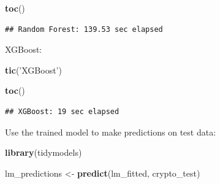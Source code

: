\documentclass[
]{book}
\newenvironment{Shaded}{\begin{snugshade}}{\end{snugshade}}
\newcommand{\DataTypeTok}[1]{\textcolor[rgb]{0.13,0.29,0.53}{#1}}
\newcommand{\KeywordTok}[1]{\textcolor[rgb]{0.13,0.29,0.53}{\textbf{#1}}}
\newcommand{\NormalTok}[1]{#1}
\newcommand{\OperatorTok}[1]{\textcolor[rgb]{0.81,0.36,0.00}{\textbf{#1}}}
\newcommand{\StringTok}[1]{\textcolor[rgb]{0.31,0.60,0.02}{#1}}
\begin{document}
\begin{Shaded}
\begin{Highlighting}[]
\KeywordTok{toc}\NormalTok{()}
\end{Highlighting}
\end{Shaded}

\begin{verbatim}
## Random Forest: 139.53 sec elapsed
\end{verbatim}

XGBoost:

\begin{Shaded}
\begin{Highlighting}[]
\KeywordTok{tic}\NormalTok{(}\StringTok{'XGBoost'}\NormalTok{)}
\end{Highlighting}
\end{Shaded}

\begin{Shaded}
\end{Shaded}

\begin{Shaded}
\begin{Highlighting}[]
\KeywordTok{toc}\NormalTok{()}
\end{Highlighting}
\end{Shaded}

\begin{verbatim}
## XGBoost: 19 sec elapsed
\end{verbatim}

Use the trained model to make predictions on test data:

\begin{Shaded}
\begin{Highlighting}[]
\KeywordTok{library}\NormalTok{(tidymodels)}
\end{Highlighting}
\end{Shaded}

\begin{Shaded}
\begin{Highlighting}[]
\NormalTok{lm_predictions <-}\StringTok{ }\KeywordTok{predict}\NormalTok{(lm_fitted, crypto_test)}
\end{Highlighting}
\end{Shaded}
\end{document}
